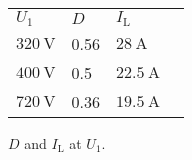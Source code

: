 \begin{solutiontable}[htb]
    \centering  %
    \begin{tabular}{llll}
        \toprule
        
        $U_\mathrm{1}$ & $D$ & $I_\mathrm{L}$ \\ 
        $\SI{320}{\volt}$ & 0.56 & $\SI{28}{\ampere}$ \\ 
        $\SI{400}{\volt}$ & 0.5 & $\SI{22.5}{\ampere}$ \\ 
        $\SI{720}{\volt}$ & 0.36 & $\SI{19.5}{\ampere}$ \\ 
        \bottomrule
    \end{tabular}
    \caption{$D$ and $I_\mathrm{L}$ at $U_\mathrm{1}$.}
    \label{table:InductorCurrentDutyCycle}
\end{solutiontable}
